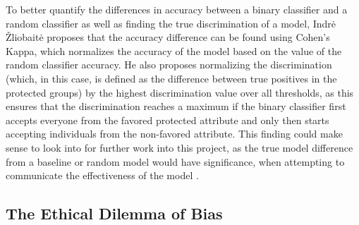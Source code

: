 \documentclass[11pt, fleqn, titlepage]{article}
\begin{document}
	To better quantify the differences in accuracy between a binary classifier and a random classifier as well as finding the true discrimination of a model, Indrė Žliobaitė proposes that the accuracy difference can be found using Cohen's Kappa, which normalizes the accuracy of the model based on the value of the random classifier accuracy. He also proposes normalizing the discrimination (which, in this case, is defined as the difference between true positives in the protected groups) by the highest discrimination value over all thresholds, as this ensures that the discrimination reaches a maximum if the binary classifier first accepts everyone from the favored protected attribute and only then starts accepting individuals from the non-favored attribute. This finding could make sense to look into for further work into this project, as the true model difference from a baseline or random model would have significance, when attempting to communicate the effectiveness of the model \cite{bias-accuracy}.
	
	
	\subsection{The Ethical Dilemma of Bias}\label{ethical_dilemma_of_bias}
	
\end{document}
